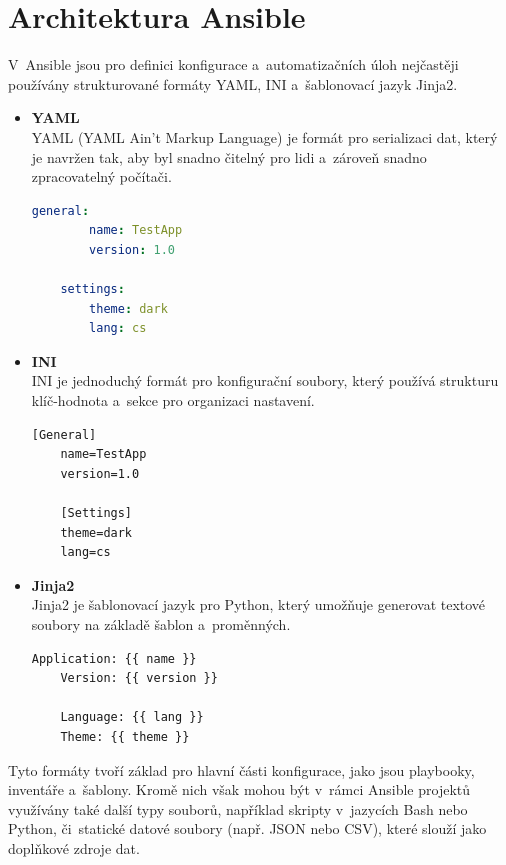 \chapter{Architektura Ansible}\label{sec:ansible}
V~Ansible jsou pro definici konfigurace a~automatizačních úloh nejčastěji používány strukturované formáty YAML, INI a~šablonovací jazyk Jinja2.
\begin{itemize}
    \item \textbf{YAML} \\
    YAML (YAML Ain't Markup Language) je formát pro serializaci dat, který je navržen tak, aby byl snadno čitelný pro lidi a~zároveň snadno zpracovatelný počítači.
    \cite{yamldocs}
    \begin{lstlisting}[language=YAML, caption={Ukázka stuktury YAML}, label={lst:yamlshowcase}, captionpos=b]
    general:
        name: TestApp
        version: 1.0

    settings:
        theme: dark
        lang: cs
    \end{lstlisting}
    \item \textbf{INI} \\
    INI je jednoduchý formát pro konfigurační soubory, který používá strukturu klíč-hodnota a~sekce pro organizaci nastavení.
        
    \begin{lstlisting}[caption={Ukázka struktury INI}, label={lst:inishowcase}, captionpos=b]
    [General]
    name=TestApp
    version=1.0

    [Settings]
    theme=dark
    lang=cs
    \end{lstlisting}

    \item \textbf{Jinja2} \\
    Jinja2 je šablonovací jazyk pro Python, který umožňuje generovat textové soubory na základě šablon a~proměnných.
    \cite{jinja2docs}
    \clearpage
    \begin{lstlisting}[language={}, caption={Ukázka Jinja2}, label={lst:jinjashowcase}, captionpos=b]
    Application: {{ name }}
    Version: {{ version }}

    Language: {{ lang }}
    Theme: {{ theme }}
    \end{lstlisting}
   
\end{itemize}
Tyto formáty tvoří základ pro hlavní části konfigurace, jako jsou playbooky, inventáře a~šablony. 
Kromě nich však mohou být v~rámci Ansible projektů využívány také další typy souborů, například skripty v~jazycích Bash nebo Python, či~statické datové soubory (např. JSON nebo CSV), které slouží jako doplňkové zdroje dat.
\cite{ansibledocs}

